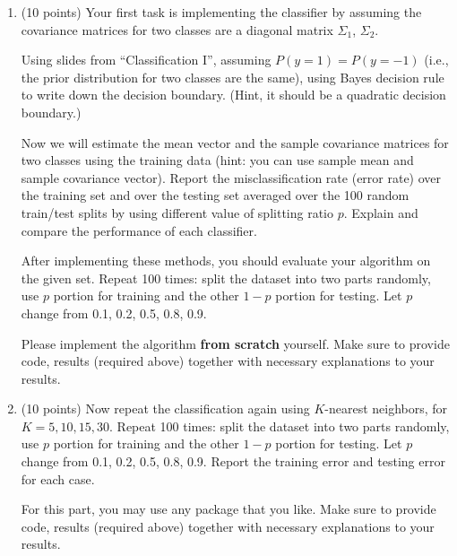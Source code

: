 \documentclass[a4paper,12pt,fleqn]{article}
\begin{document}
\begin{enumerate}
\item (10 points)
Your first task is implementing the classifier by assuming the covariance matrices for two classes are a diagonal matrix $\Sigma_1$, $\Sigma_ 2$. 

Using slides from ``Classification I'', assuming $P(y=1) = P(y=-1)$ (i.e., the prior distribution for two classes are the same), using Bayes decision rule to write down the decision boundary. (Hint, it should be a quadratic decision boundary.)


Now we will estimate the mean vector and the sample covariance matrices for two classes using the training data (hint: you can use sample mean and sample covariance vector). Report the misclassification rate (error rate) over the training set and over the testing set averaged over the 100 random train/test splits by using different value of splitting ratio $p$. Explain and compare the performance of each classifier.

After implementing these methods, you should evaluate your algorithm on the given set. Repeat 100 times: split the dataset into two parts randomly, use $p$ portion for training and the other $1 - p$ portion for testing. Let $p$ change from 0.1, 0.2, 0.5, 0.8, 0.9.

Please implement the algorithm {\bf from scratch} yourself. Make sure to provide code, results (required above) together with necessary explanations to your results. 

\item (10 points) Now repeat the classification again using $K$-nearest neighbors, for $K = 5, 10, 15, 30$.  Repeat 100 times: split the dataset into two parts randomly, use $p$ portion for training and the other $1 - p$ portion for testing. Let $p$ change from 0.1, 0.2, 0.5, 0.8, 0.9. Report the training error and testing error for each case.

For this part, you may use any package that you like.  Make sure to provide code, results (required above) together with necessary explanations to your results. 

\end{enumerate}


\label{finalpage}
\end{document}
